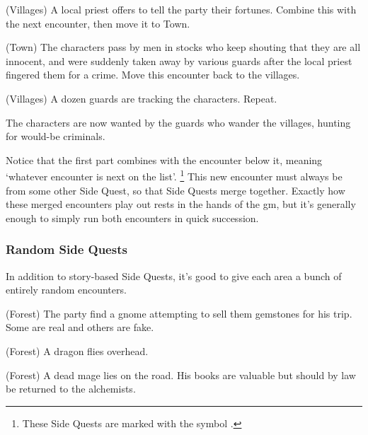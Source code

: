 \begin{multicols}{2}
\begin{list}{\sqn}{}

  \item[\sqr\squash]
  (Villages) A local priest offers to tell the party their fortunes.  Combine this with the next encounter, then move it to Town.

  \item
  (Town) The characters pass by men in stocks who keep shouting that they are all innocent, and were suddenly taken away by various guards after the local priest fingered them for a crime.  Move this encounter back to the villages.

  \item
  (Villages) A dozen guards are tracking the characters. Repeat.

\end{list}

The characters are now wanted by the guards who wander the villages, hunting for would-be criminals.

Notice that the first part combines with the encounter below it, meaning `whatever encounter is next on the list'.%
\footnote{These Side Quests are marked with the symbol \squash.}
This new encounter must always be from some other Side Quest, so that Side Quests merge together.
Exactly how these merged encounters play out rests in the hands of the \gls{gm}, but it's generally enough to simply run both encounters in quick succession.

\subsubsection{Random Side Quests}

In addition to story-based Side Quests, it's good to give each area a bunch of entirely random encounters.

\begin{list}{\sqn}{}

  \item{(Forest) The party find a gnome attempting to sell them gemstones for his trip. Some are real and others are fake.}

  \item{(Forest) A dragon flies overhead.}

  \item
  (Forest) A dead mage lies on the road. His books are valuable but should by law be returned to the alchemists.

\end{list}


\end{multicols}
